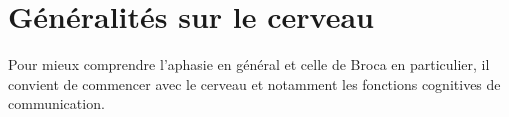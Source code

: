 \section{Généralités sur le cerveau}

Pour mieux comprendre l'aphasie en général et celle de Broca en particulier, 
il convient de commencer avec le cerveau et notamment les fonctions cognitives de communication.